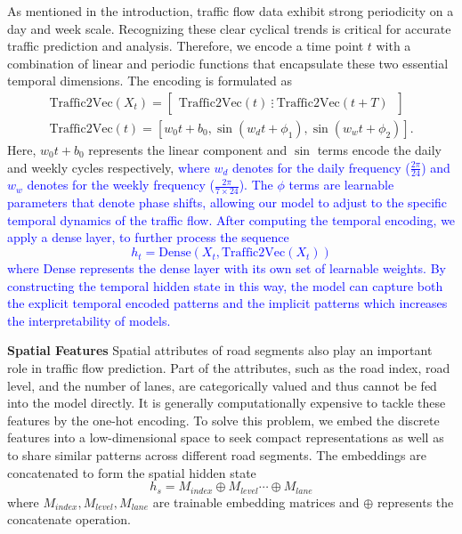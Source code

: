 \documentclass[lettersize,journal]{IEEEtran}
\begin{document}
As mentioned in the introduction, traffic flow data exhibit strong periodicity on a day and week scale. Recognizing these clear cyclical trends is critical for accurate traffic prediction and analysis. Therefore, we encode a time point $t$ with a combination of linear and periodic functions that encapsulate these two essential temporal dimensions. The encoding is formulated as
\begin{gather}
    \text{Traffic2Vec}(X_t) = 
    \begin{bmatrix} 
    \text{Traffic2Vec}(t)  \ 
    \vdots \ 
    \text{Traffic2Vec}(t+T) \ 
    \end{bmatrix}\\
    \text{Traffic2Vec}(t) = [w_0 t + b_0, \sin(w_d t + \phi_1), \sin(w_w t + \phi_2)].
\end{gather} 
Here, $w_0 t + b_0$ represents the linear component and  $\sin$ terms encode the daily and weekly cycles respectively, \textcolor{blue}{where $w_d$ denotes for the daily frequency ($\frac{2\pi}{24}$) and $w_w$ denotes for the weekly frequency ($\frac{2\pi}{7 \times 24}$). The $\phi$ terms are learnable parameters that denote phase shifts, allowing our model to adjust to the specific temporal dynamics of the traffic flow.
After computing the temporal encoding, we apply a dense layer, to further process the sequence
\begin{equation}
h_t = \text{Dense}(X_t,\text{Traffic2Vec}(X_t))
\end{equation}
where Dense represents the dense layer with its own set of learnable weights. By constructing the temporal hidden state in this way, the model can capture both the explicit temporal encoded patterns and the implicit patterns which increases the interpretability of models.}

\textbf{Spatial Features} Spatial attributes of road segments also play an important role in traffic flow prediction. Part of the attributes, such as the road index, road level, and the number of lanes, are categorically valued and thus cannot be fed into the model directly. It is generally computationally expensive to tackle these features by the one-hot encoding. To solve this problem, we embed the discrete features into a low-dimensional space to seek compact representations as well as to share similar patterns across different road segments. The embeddings are concatenated to form the spatial hidden state 
\begin{equation}
    h_s = M_{index} \oplus M_{level} \cdots \oplus M_{lane}
\end{equation}
where $ M_{index}, M_{level}, M_{lane}$ are trainable embedding matrices and $\oplus$ represents the concatenate operation.
\end{document}
